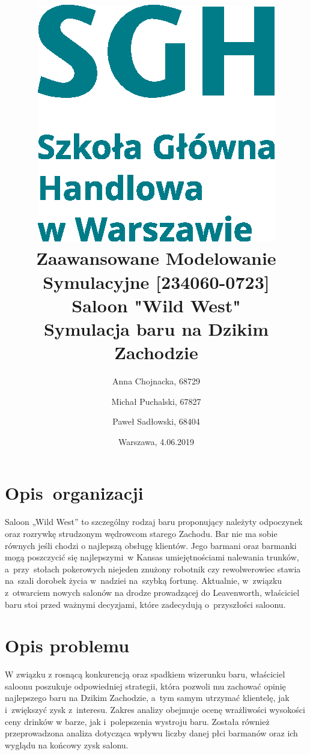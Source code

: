 \documentclass[12pt, a4paper, oneside]{mwart} %
\begin{document}
\title{\includegraphics[width = 0.3 \textwidth]{wykresy/SGHlogotypCMYKpl.eps}\\
\bigskip
Zaawansowane Modelowanie Symulacyjne [234060-0723]\\ 
\bigskip
Saloon "Wild West"\\
Symulacja baru na Dzikim Zachodzie}
\author{Anna Chojnacka, 68729 \and
Michał Puchalski, 67827 \and
Paweł Sadłowski, 68404 }
\date{Warszawa, 4.06.2019}
\maketitle

\pagebreak

\section{Opis~organizacji}
Saloon „Wild West” to szczególny rodzaj baru proponujący należyty odpoczynek oraz rozrywkę strudzonym wędrowcom starego Zachodu. Bar nie ma sobie równych jeśli chodzi o najlepszą obsługę klientów. Jego barmani oraz barmanki mogą poszczycić się najlepszymi~w Kansas umiejętnościami nalewania trunków, a~przy~stołach pokerowych niejeden znużony robotnik czy rewolwerowiec stawia na~szali dorobek życia w~nadziei na~szybką fortunę. Aktualnie, w~związku z~otwarciem nowych salonów na drodze prowadzącej do Leavenworth, właściciel baru stoi przed ważnymi decyzjami, które zadecydują o~przyszłości saloonu.

\section{Opis problemu}
W związku z rosnącą konkurencją oraz spadkiem wizerunku baru, właściciel saloonu poszukuje odpowiedniej strategii, która pozwoli mu zachować opinię najlepszego baru na Dzikim Zachodzie, a~tym samym utrzymać klientelę, jak i~zwiększyć zysk z~interesu. Zakres analizy obejmuje ocenę wrażliwości wysokości ceny drinków w barze, jak i~polepszenia wystroju baru. Została również przeprowadzona analiza dotycząca wpływu liczby danej płci barmanów oraz ich wyglądu na końcowy zysk salonu.
\end{document}
